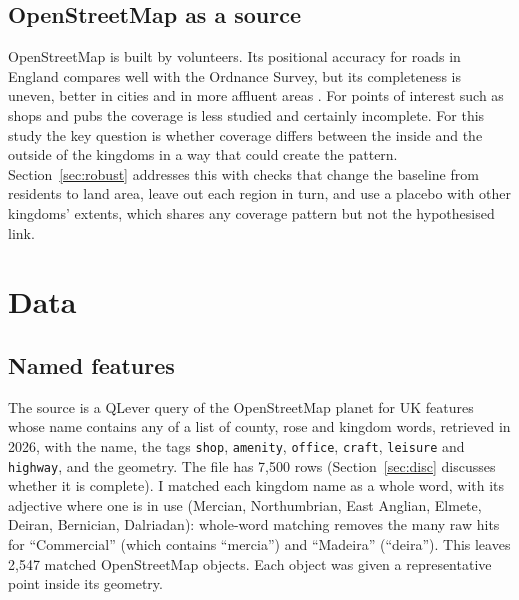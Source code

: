 \documentclass[11pt,a4paper]{article}
\begin{document}
\subsection{OpenStreetMap as a source}
OpenStreetMap is built by volunteers. Its positional accuracy for roads in England compares well with the Ordnance Survey, but its completeness is uneven, better in cities and in more affluent areas \citep{haklay2010}. For points of interest such as shops and pubs the coverage is less studied and certainly incomplete. For this study the key question is whether coverage differs between the inside and the outside of the kingdoms in a way that could create the pattern. Section~\ref{sec:robust} addresses this with checks that change the baseline from residents to land area, leave out each region in turn, and use a placebo with other kingdoms' extents, which shares any coverage pattern but not the hypothesised link.

\section{Data}\label{sec:data}
\subsection{Named features}
The source is a QLever query of the OpenStreetMap planet \citep{bast2017,bast2021} for UK features whose name contains any of a list of county, rose and kingdom words, retrieved in 2026, with the name, the tags \texttt{shop}, \texttt{amenity}, \texttt{office}, \texttt{craft}, \texttt{leisure} and \texttt{highway}, and the geometry. The file has 7,500 rows (Section~\ref{sec:disc} discusses whether it is complete). I matched each kingdom name as a whole word, with its adjective where one is in use (Mercian, Northumbrian, East Anglian, Elmete, Deiran, Bernician, Dalriadan): whole-word matching removes the many raw hits for ``Commercial'' (which contains ``mercia'') and ``Madeira'' (``deira''). This leaves 2,547 matched OpenStreetMap objects. Each object was given a representative point inside its geometry.
\end{document}
